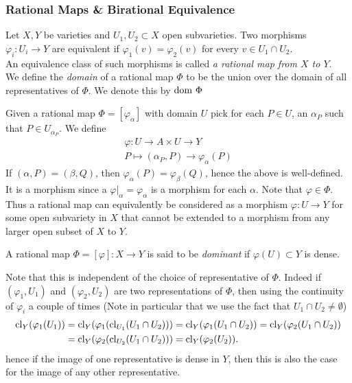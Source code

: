     \subsubsection{Rational Maps \& Birational Equivalence}
    \begin{definition}
        Let $X,Y$ be varieties and $U_1,U_2\subset X$ open subvarieties. Two morphisms $\varphi_i : U_i\rightarrow Y$ are equivalent if $\varphi_1(v)=\varphi_2(v)$ for every $v\in U_1\cap U_2$.\\
        An equivalence class of such morphisms is called \textit{a rational map from $X$ to $Y$}.\\
        We define the \textit{domain} of a rational map $\Phi$ to be the union over the domain of all representatives of $\Phi$. We denote this by $\mathrm{dom} \ \Phi$
    \end{definition}
    \begin{remark}
        Given a rational map $\Phi=[\varphi_\alpha]$ with domain $U$ pick for each $P\in U$, an $\alpha_P$ such that $P\in U_{\alpha_P}$. We define 
        \begin{gather*}
            \varphi: U \rightarrow A\times U\rightarrow Y\\
            P \mapsto (\alpha_P,P)\rightarrow \varphi_\alpha(P)
        \end{gather*}
        If $(\alpha,P)=(\beta,Q)$, then $\varphi_\alpha(P)=\varphi_\beta(Q)$, hence the above is well-defined. It is a morphism since a $\left.\varphi\right|_\alpha = \varphi_\alpha$ is a morphism for each $\alpha$. Note that $\varphi \in \Phi$. Thus a rational map can equivalently be considered as a morphism $\varphi: U \rightarrow Y$ for some open subvariety in $X$ that cannot be extended to a morphism from any larger open subset of $X$ to $Y$.
    \end{remark}
    \begin{definition}
        A rational map $\Phi=[\varphi]: X \rightarrow Y$ is said to be \textit{dominant} if $\varphi(U)\subset Y$ is dense. 
    \end{definition}
    \begin{remark}
        Note that this is independent of the choice of representative of $\Phi$. Indeed if $(\varphi_1,U_1)$ and $(\varphi_2,U_2)$ are two representations of $\Phi$, then using the continuity of $\varphi_i$ a couple of times (Note in particular that we use the fact that $U_1\cap U_2\neq \emptyset$)
        \begin{align*}
            \mathrm{cl}_Y(\varphi_1(U_1))&=\mathrm{cl}_Y(\varphi_1(\mathrm{cl}_{U_1}(U_1\cap U_2))) = \mathrm{cl}_Y(\varphi_1(U_1\cap U_2))=\mathrm{cl}_Y(\varphi_2(U_1\cap U_2))\\ 
            &= \mathrm{cl}_Y(\varphi_2(\mathrm{cl}_{U_2}(U_1\cap U_2)))= \mathrm{cl}_Y(\varphi_2(U_2)).
        \end{align*}
        hence if the image of one representative is dense in $Y$, then this is also the case for the image of any other representative. 
    \end{remark}
